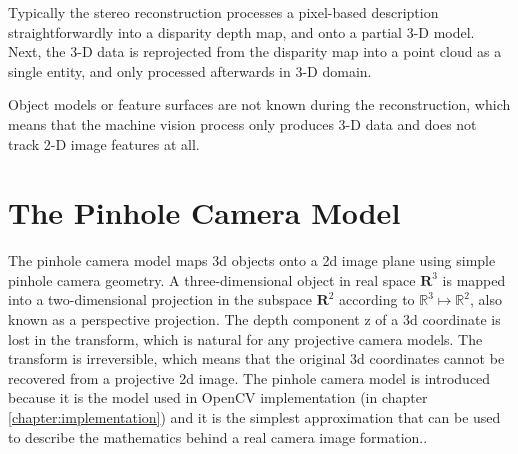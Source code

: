 \documentclass[12pt,a4paper,oneside,pdftex]{report}
\begin{document}
Typically the stereo reconstruction processes a pixel-based description straightforwardly into a disparity depth map, and onto a partial 3-D model. Next, the 3-D data is reprojected from the disparity map into a point cloud as a single entity, and only processed afterwards in 3-D domain.


Object models or feature surfaces are not known during the reconstruction, which means that the machine vision process only produces 3-D data and does not track 2-D image features at all. 


\section{The Pinhole Camera Model}
\label{section:the_pinhole_camera_model}

The pinhole camera model maps 3d objects onto a 2d image plane using simple pinhole camera geometry. A three-dimensional object in real space $\mathbf{R}^3$ is mapped into a two-dimensional projection in the subspace $\mathbf{R}^2$ according to $\mathbb{R}^3 \mapsto \mathbb{R}^2$, also known as a perspective projection. The depth component z of a 3d coordinate is lost in the transform, which is natural for any projective camera models. The transform is irreversible, which means that the original 3d coordinates cannot be recovered from a projective 2d image. The pinhole camera model is introduced because it is the model used in OpenCV implementation (in chapter \ref{chapter:implementation}) and it is the simplest approximation that can be used to describe the mathematics behind a real camera image formation.\citep{Sonka07, OpenCVWeb}.
\end{document}

